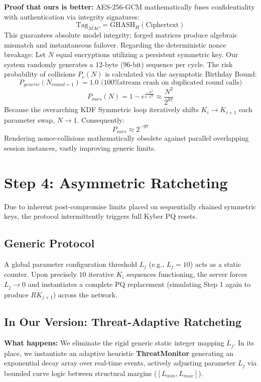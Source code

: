 \documentclass[12pt]{article}
\begin{document}
\textbf{Proof that ours is better:} 
AES-256-GCM mathematically fuses confidentiality with authentication via integrity signatures:
\[
\text{Tag}_{MAC} = \text{GHASH}_H(\text{Ciphertext})
\]
This guarantees absolute model integrity; forged matrices produce algebraic mismatch and instantaneous failover. Regarding the deterministic nonce breakage:
Let $N$ equal encryptions utilizing a persistent symmetric key. Our system randomly generates a 12-byte (96-bit) sequence per cycle. The risk probability of collisions $P_c(N)$ is calculated via the asymptotic Birthday Bound:
\[
P_{generic}(N_{round=1}) = 1.0 \text{ (100\% stream crash on duplicated round calls)}
\]
\[
P_{ours}(N) = 1 - e^{\frac{-N^2}{2 \cdot 2^{96}}} \approx \frac{N^2}{2^{97}}
\]
Because the overarching KDF Symmetric loop iteratively shifts $K_i \to K_{i+1}$ each parameter swap, $N \to 1$. Consequently:
\[
P_{ours} \approx 2^{-97}
\]
Rendering nonce-collisions mathematically obsolete against parallel overlapping session instances, vastly improving generic limits.

\section*{Step 4: Asymmetric Ratcheting}

Due to inherent post-compromise limits placed on sequentially chained symmetric keys, the protocol intermittently triggers full Kyber PQ resets.

\subsection*{Generic Protocol}
A global parameter configuration threshold $L_j$ (e.g., $L_j = 10$) acts as a static counter. Upon precisely $10$ iterative $K_i$ sequences functioning, the server forces $L_j \to 0$ and instantiates a complete PQ replacement (simulating Step 1 again to produce $RK_{j+1}$) across the network. 

\subsection*{In Our Version: Threat-Adaptive Ratcheting}
\textbf{What happens:} We eliminate the rigid generic static integer mapping $L_j$. In its place, we instantiate an adaptive heuristic \textbf{ThreatMonitor} generating an exponential decay array over real-time events, actively adjusting parameter $L_j$ via bounded curve logic between structural margins ($[L_{min}, L_{max}]$). 
\end{document}
